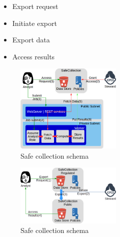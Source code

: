 \begin{itemize}
\item Export request
\item Initiate export
\item Export data
\item Access results
\end{itemize}





\begin{figure}
  \center
  \includegraphics[width=0.45\textwidth]{figures/safe_flow.png}
  \caption{Safe collection schema}
  \label{fig:flow1}
  \vspace{-1.5em}
\end{figure}


\begin{figure}
  \center
  \includegraphics[width=0.45\textwidth]{figures/export_flow.png}
  \caption{Safe collection schema}
  \label{fig:flow2}
  \vspace{-1.5em}
\end{figure}









